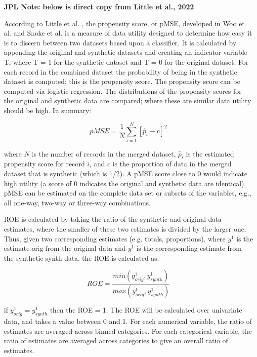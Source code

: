 \documentclass[runningheads]{llncs}
\begin{document}
{\bf JPL Note: below is direct copy from Little et al., 2022}

According to Little et al. \cite{little2022comparing}, the propensity score, or pMSE, developed in Woo et al. \cite{woo2009global} and Snoke et al. \cite{snoke2018general} is a measure of data utility designed to determine how easy it is to discern between two datasets based upon a classifier. It is calculated by appending the original and synthetic datasets and creating an indicator variable T, where T = 1 for the synthetic dataset and T = 0 for the original dataset. For each record in the combined dataset the probability of being in the synthetic dataset is computed; this is the propensity score. The propensity score can be computed via logistic regression. The distributions of the propensity scores for the original and synthetic data are compared; where these are similar data utility should be high. In summary:

\begin{equation}
pMSE = \frac{1}{N}\sum_{i=1}^{N}[\hat{p}_i - c]^2
\end{equation}

where $N$ is the number of records in the merged dataset, $\hat{p}_i$ is the estimated propensity score for record $i$, and $c$ is the proportion of data in the merged dataset that is synthetic (which is 1/2). A pMSE score close to 0 would indicate high utility (a score of 0 indicates the original and synthetic data are identical).  pMSE can be estimated on the complete data set or subsets of the variables, e.g., all one-way, two-way or three-way combinations.

ROE is calculated by taking the ratio of the synthetic and original data estimates, where the smaller of these two estimates is divided by the larger one. Thus, given two corresponding estimates (e.g. totals, proportions), where $y^1$ is the estimate orig from the original data and $y^1$ is the corresponding estimate from the synthetic synth data, the ROE is calculated as:

\begin{equation}
    ROE = \frac{min(y_{orig}^1,y_{synth}^1)}{max(y_{orig}^1,y_{synth}^1)}
\end{equation}

if $y^1_{orig}=y^1_{synth}$ then the ROE = 1. The ROE will be calculated over univariate data, and takes a value between 0 and 1. For each numerical variable, the ratio of estimates are averaged across binned categories.  For each categorical variable, the ratio of estimates are averaged across categories to give an overall ratio of estimates.
\end{document}
